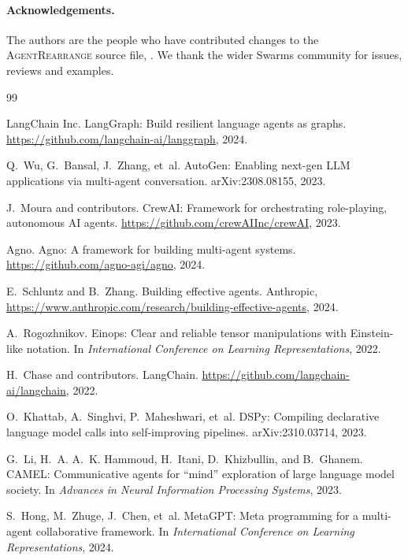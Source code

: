 \documentclass[11pt]{article}
\newcommand{\AR}{\textsc{AgentRearrange}}
\begin{document}
\paragraph{Acknowledgements.}
The authors are the people who have contributed changes to the \AR{} source file, . We thank the wider Swarms community for issues, reviews and examples.

\begin{thebibliography}{99}\setlength{\itemsep}{0pt}\setlength{\parskip}{0pt}\setlength{\parsep}{0pt}

LangChain Inc.
\newblock LangGraph: Build resilient language agents as graphs.
\newblock \url{https://github.com/langchain-ai/langgraph}, 2024.

Q.~Wu, G.~Bansal, J.~Zhang, et~al.
\newblock AutoGen: Enabling next-gen LLM applications via multi-agent conversation.
\newblock arXiv:2308.08155, 2023.

J.~Moura and contributors.
\newblock CrewAI: Framework for orchestrating role-playing, autonomous AI agents.
\newblock \url{https://github.com/crewAIInc/crewAI}, 2023.

Agno.
\newblock Agno: A framework for building multi-agent systems.
\newblock \url{https://github.com/agno-agi/agno}, 2024.

E.~Schluntz and B.~Zhang.
\newblock Building effective agents.
\newblock Anthropic, \url{https://www.anthropic.com/research/building-effective-agents}, 2024.

A.~Rogozhnikov.
\newblock Einops: Clear and reliable tensor manipulations with Einstein-like notation.
\newblock In \emph{International Conference on Learning Representations}, 2022.

H.~Chase and contributors.
\newblock LangChain.
\newblock \url{https://github.com/langchain-ai/langchain}, 2022.

O.~Khattab, A.~Singhvi, P.~Maheshwari, et~al.
\newblock DSPy: Compiling declarative language model calls into self-improving pipelines.
\newblock arXiv:2310.03714, 2023.

G.~Li, H.~A. A.~K. Hammoud, H.~Itani, D.~Khizbullin, and B.~Ghanem.
\newblock CAMEL: Communicative agents for ``mind'' exploration of large language model society.
\newblock In \emph{Advances in Neural Information Processing Systems}, 2023.

S.~Hong, M.~Zhuge, J.~Chen, et~al.
\newblock MetaGPT: Meta programming for a multi-agent collaborative framework.
\newblock In \emph{International Conference on Learning Representations}, 2024.


\end{thebibliography}
\end{document}
